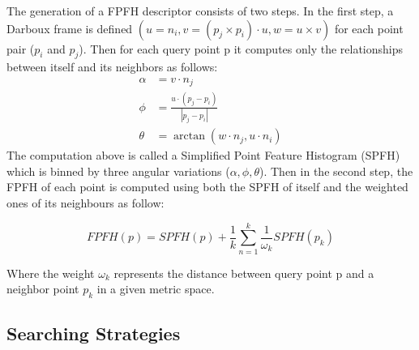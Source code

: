 The generation of a FPFH descriptor consists of two steps. In the first step, a Darboux frame is defined $(u=n_{i},v=(p_{j} \times p_{i}) \cdot u,w=u\times v)$ for each point pair ($p_{i}$ and $p_{j}$). Then for each query point p it computes only the relationships between itself and its neighbors as follows:
\begin{align}
    \alpha& = v \cdot n_{j}\nonumber \\
    \phi&= \frac{u \cdot (p_{j} - p_{i})}{|p_{j} - p_{i}|}\label{pfheq} \\
    \theta &= \arctan(w \cdot n_{j} , u \cdot n_{i})\nonumber
\end{align}
The computation above is called a Simplified Point Feature Histogram (SPFH) which is binned by three angular variations ($\alpha , \phi , \theta$). Then in the second step, the FPFH of each point is computed using both the SPFH of itself and the weighted ones of its neighbours as follow:

\begin{equation}\label{fpfheq}
    FPFH(p) = SPFH(p)+\frac{1}{k}\sum\limits_{n=1}^{k}\frac{1}{\omega _{k}}SPFH(p_{k})
\end{equation}

Where the weight $\omega _{k}$ represents the distance between query point p and a neighbor point $p_{k}$ in a given metric space.

\subsection{Searching Strategies}

